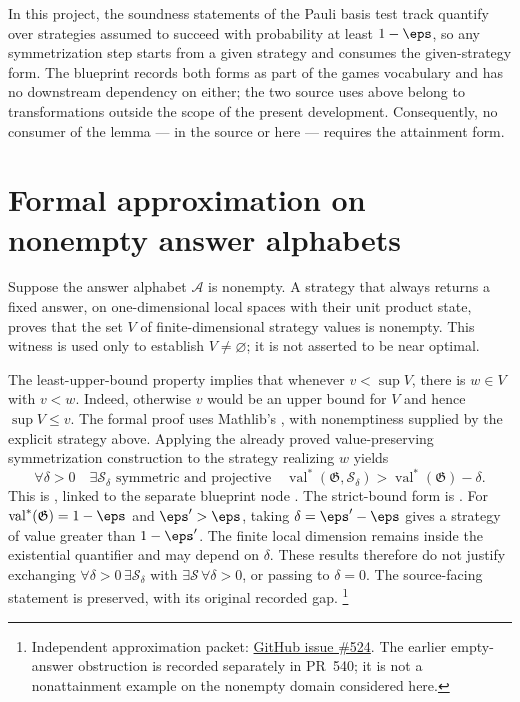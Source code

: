 \documentclass[11pt]{article}
\newcommand{\val}{\operatorname{val}}
\newcommand{\game}{\mathfrak{G}}
\newcommand{\strategy}{\mathcal{S}}
\renewcommand{\ghissue}[1]{%
  \href{https://github.com/Dengnifer/MIPStarRE-A/issues/#1}{GitHub issue \##1}}
\begin{document}
In this project, the soundness statements of the Pauli basis test track
quantify over strategies assumed to succeed with probability at least
$1-\eps$, so any symmetrization step starts from a given strategy and consumes
the given-strategy form.  The blueprint records both forms as part of the
games vocabulary and has no downstream dependency on either; the two source
uses above belong to transformations outside the scope of the present
development.
Consequently, no consumer of the lemma --- in the source or here --- requires
the attainment form.

\section{Formal approximation on nonempty answer alphabets}

Suppose the answer alphabet $\mathcal A$ is nonempty. A strategy that always
returns a fixed answer, on one-dimensional local spaces with their unit
product state, proves that the set $V$ of finite-dimensional strategy values
is nonempty. This witness is used only to establish $V\ne\varnothing$;
it is not asserted to be near optimal.

The least-upper-bound property implies that whenever $v<\sup V$, there is
$w\in V$ with $v<w$. Indeed, otherwise $v$ would be an upper bound for $V$
and hence $\sup V\leq v$. The formal proof uses Mathlib's
, with nonemptiness supplied by the
explicit strategy above. Applying the already proved value-preserving
symmetrization construction to the strategy realizing $w$ yields
\[
  \forall\delta>0\quad\exists\strategy_\delta
  \text{ symmetric and projective}\quad
  \val^*(\game,\strategy_\delta)>\val^*(\game)-\delta.
\]
This is , linked to
the separate blueprint node .
The strict-bound form is
.
For $\val^*(\game)=1-\eps$ and $\eps'>\eps$, taking
$\delta=\eps'-\eps$ gives a strategy of value greater than $1-\eps'$.
The finite local dimension remains inside the existential quantifier and
may depend on $\delta$. These results therefore do not justify exchanging
$\forall\delta>0\,\exists\strategy_\delta$ with
$\exists\strategy\,\forall\delta>0$, or passing to $\delta=0$.
The source-facing statement is preserved, with its original recorded gap.%
\footnote{Independent approximation packet: \ghissue{524}. The earlier
empty-answer obstruction is recorded separately in PR~540; it is not a
nonattainment example on the nonempty domain considered here.}
\end{document}
